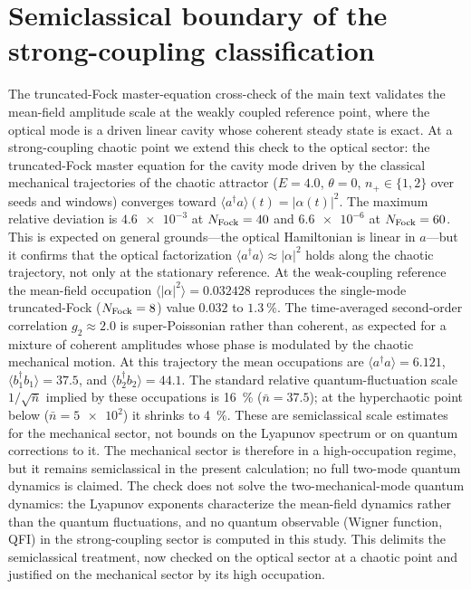 \documentclass[preprint,numbers,a4paper]{elsarticle}
\begin{document}
\section{Semiclassical boundary of the strong-coupling classification}
\label{SI-sec:semiclassical-boundary}

The truncated-Fock master-equation cross-check of the main text validates the mean-field amplitude scale at the weakly coupled reference point, where the optical mode is a driven linear cavity whose coherent steady state is exact. At a strong-coupling chaotic point we extend this check to the optical sector: the truncated-Fock master equation for the cavity mode driven by the classical mechanical trajectories of the chaotic attractor ($E=\num{4.0}$, $\theta=0$, $n_+\in\{1,2\}$ over seeds and windows) converges toward $\langle a^\dagger a\rangle(t)=|\alpha(t)|^2$. The maximum relative deviation is $\num{4.6e-3}$ at $N_{\rm Fock}=\num{40}$ and $\num{6.6e-6}$ at $N_{\rm Fock}=\num{60}$. This is expected on general grounds---the optical Hamiltonian is linear in $a$---but it confirms that the optical factorization $\langle a^\dagger a\rangle\approx|\alpha|^2$ holds along the chaotic trajectory, not only at the stationary reference. At the weak-coupling reference the mean-field occupation $\langle|\alpha|^2\rangle=\num{0.032428}$ reproduces the single-mode truncated-Fock ($N_{\rm Fock}=\num{8}$) value $\num{0.032}$ to $\qty{1.3}{\percent}$. The time-averaged second-order correlation $g_2\approx\num{2.0}$ is super-Poissonian rather than coherent, as expected for a mixture of coherent amplitudes whose phase is modulated by the chaotic mechanical motion. At this trajectory the mean occupations are $\langle a^\dagger a\rangle=\num{6.121}$, $\langle b_1^\dagger b_1\rangle=\num{37.5}$, and $\langle b_2^\dagger b_2\rangle=\num{44.1}$. The standard relative quantum-fluctuation scale $1/\sqrt{\bar n}$ implied by these occupations is \qty{16}{\percent} ($\bar n=\num{37.5}$); at the hyperchaotic point below ($\bar n=\num{5e2}$) it shrinks to \qty{4}{\percent}. These are semiclassical scale estimates for the mechanical sector, not bounds on the Lyapunov spectrum or on quantum corrections to it. The mechanical sector is therefore in a high-occupation regime, but it remains semiclassical in the present calculation; no full two-mode quantum dynamics is claimed. The check does not solve the two-mechanical-mode quantum dynamics: the Lyapunov exponents characterize the mean-field dynamics rather than the quantum fluctuations, and no quantum observable (Wigner function, QFI) in the strong-coupling sector is computed in this study. This delimits the semiclassical treatment, now checked on the optical sector at a chaotic point and justified on the mechanical sector by its high occupation.
\end{document}
